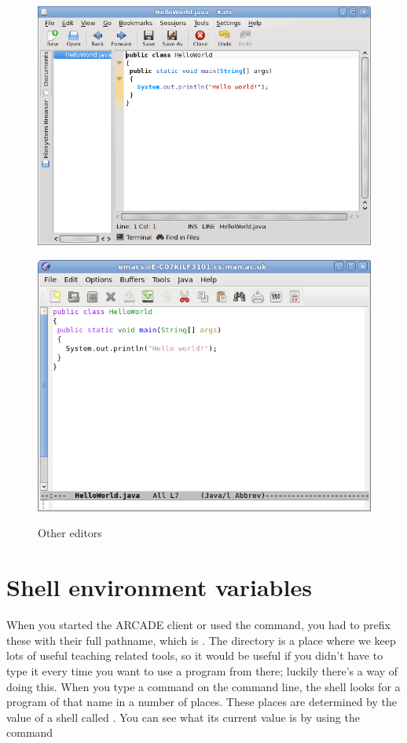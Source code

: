 \begin{figure}
  \begin{minipage}[b]{.5\linewidth}
    \centering
    \includegraphics[width=.8\textwidth]{images/kate}  
    \label{subfig:kate}
  \end{minipage}%
  \begin{minipage}[b]{.5\linewidth}
    \centering
    \includegraphics[width=.8\textwidth]{images/emacs}
    \label{subfig:emacs}
  \end{minipage}%
  \caption{Other editors}  \label{fig:texteditors}
  
\end{figure}

\section{Shell environment variables}

When you started the ARCADE client or used the  command, you had to prefix these with their full pathname, which is . The directory
 is a place where we keep lots of useful
teaching related tools, so it would be useful if you didn't have to
type it every time you want to use a program from there; luckily
there's a way of doing this. When you type a command on the command
line, the shell looks for a program of that name in a number of
places. These places are determined by the value of a shell
 called
. You can see what its current value is by using the
command

